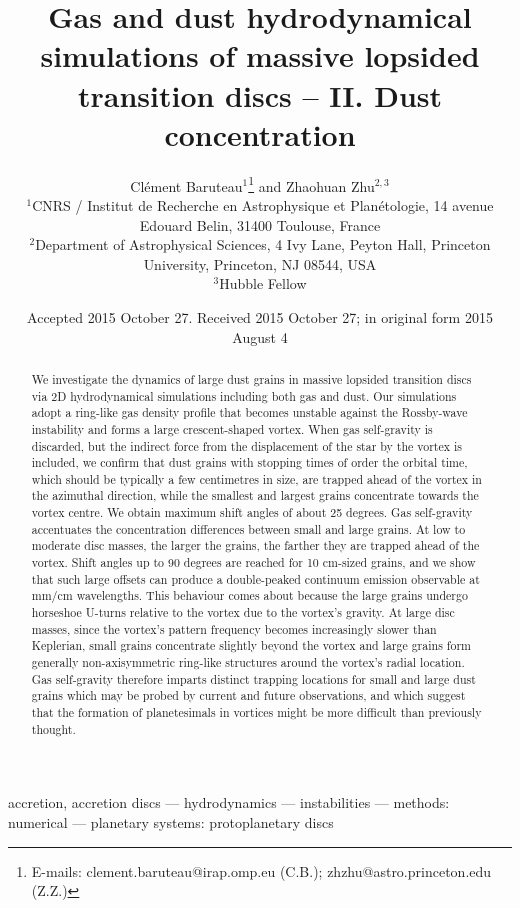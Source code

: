 \documentclass[a4paper,usenatbib]{mnras}
\title[Massive lopsided transition discs II]{Gas and dust
  hydrodynamical simulations of massive lopsided transition discs --
  II.  Dust concentration}
\author[Baruteau and Zhu]{Cl{\'e}ment Baruteau$^1$\thanks{E-mails:
    clement.baruteau@irap.omp.eu (C.B.); zhzhu@astro.princeton.edu
    (Z.Z.)}
  and Zhaohuan Zhu$^{2,3}$\\
  $^1$CNRS / Institut de Recherche en Astrophysique et Plan{\'e}tologie, 14 avenue Edouard Belin, 31400 Toulouse, France\\
  $^2$Department of Astrophysical Sciences, 4 Ivy Lane, Peyton Hall,
  Princeton University, Princeton, NJ 08544, USA\\
  $^3$Hubble Fellow }
\date{Accepted 2015 October 27.  Received 2015 October 27; in original form 2015 August 4}
\begin{document}
\label{firstpage}
\pagerange{\pageref{firstpage}--\pageref{lastpage}} 
\maketitle

\begin{abstract}
  We investigate the dynamics of large dust grains in massive lopsided
  transition discs via 2D hydrodynamical simulations including both
  gas and dust.  Our simulations adopt a ring-like gas density profile
  that becomes unstable against the Rossby-wave instability and forms
  a large crescent-shaped vortex. When gas self-gravity is discarded,
  but the indirect force from the displacement of the star by the
  vortex is included, we confirm that dust grains with stopping times
  of order the orbital time, which should be typically a few
  centimetres in size, are trapped ahead of the vortex in the
  azimuthal direction, while the smallest and largest grains
  concentrate towards the vortex centre. We obtain maximum shift
  angles of about 25 degrees.  Gas self-gravity accentuates the
  concentration differences between small and large grains. At low to
  moderate disc masses, the larger the grains, the farther they are
  trapped ahead of the vortex. Shift angles up to 90 degrees are
  reached for 10 cm-sized grains, and we show that such large offsets
  can produce a double-peaked continuum emission observable at mm/cm
  wavelengths. This behaviour comes about because the large grains
  undergo horseshoe U-turns relative to the vortex due to the vortex's
  gravity. At large disc masses, since the vortex's pattern frequency
  becomes increasingly slower than Keplerian, small grains concentrate
  slightly beyond the vortex and large grains form generally
  non-axisymmetric ring-like structures around the vortex's radial
  location. Gas self-gravity therefore imparts distinct trapping
  locations for small and large dust grains which may be probed by
  current and future observations, and which suggest that the formation
  of planetesimals in vortices might be more difficult than previously
  thought.
\end{abstract}


\begin{keywords}
  accretion, accretion discs --- hydrodynamics --- instabilities ---
  methods: numerical --- planetary systems: protoplanetary discs
\end{keywords}


\end{document}
